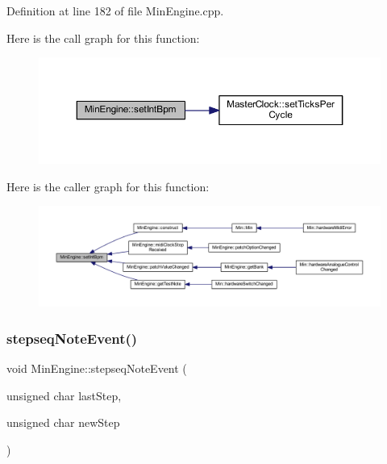 Definition at line 182 of file Min\+Engine.\+cpp.

Here is the call graph for this function\+:
\nopagebreak
\begin{figure}[H]
\begin{center}
\leavevmode
\includegraphics[width=350pt]{d4/d0f/class_min_engine_a7ef07f3911096d861e030cccfd8899b5_cgraph}
\end{center}
\end{figure}
Here is the caller graph for this function\+:
\nopagebreak
\begin{figure}[H]
\begin{center}
\leavevmode
\includegraphics[width=350pt]{d4/d0f/class_min_engine_a7ef07f3911096d861e030cccfd8899b5_icgraph}
\end{center}
\end{figure}
\mbox{\label{class_min_engine_a46ab2a887b8c83c9b484304778bc01a1}} 
\subsubsection{\texorpdfstring{stepseq\+Note\+Event()}{stepseqNoteEvent()}}
{\footnotesize\ttfamily void Min\+Engine\+::stepseq\+Note\+Event (\begin{DoxyParamCaption}\item[{unsigned char}]{last\+Step,  }\item[{unsigned char}]{new\+Step }\end{DoxyParamCaption})\hspace{0.3cm}{\ttfamily [virtual]}}



